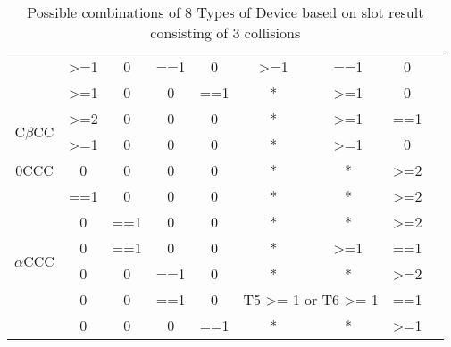 \documentclass[fleqn]{article}
\begin{document}
\begin {table} [h]
\begin{tabular}{|c|c|c|c|c|c|c|c|c|}
                             & \textgreater{}=1               & 0                              & ==1              & 0   & \textgreater{}=1                 & ==1                             & 0                \\ \cline{2-8} 
                             & \textgreater{}=1               & 0                              & 0                & ==1 & *                                & \textgreater{}=1                & 0                \\ \hline
\multirow{2}{*}{C$\beta$CC}  & \textgreater{}=2               & 0                              & 0                & 0   & *                                & \textgreater{}=1                & ==1              \\ \cline{2-8} 
                             & \textgreater{}=1               & 0                              & 0                & 0   & *                                & \textgreater{}=1                & 0                \\ \hline
0CCC                         & 0                              & 0                              & 0                & 0   & *                                & *                               & \textgreater{}=2 \\ \hline
\multirow{6}{*}{$\alpha$CCC} & ==1                            & 0                              & 0                & 0   & *                                & *                               & \textgreater{}=2 \\ \cline{2-8} 
                             & 0                              & ==1                            & 0                & 0   & *                                & *                               & \textgreater{}=2 \\ \cline{2-8} 
                             & 0                              & ==1                            & 0                & 0   & *                                & \textgreater{}=1                & ==1              \\ \cline{2-8} 
                             & 0                              & 0                              & ==1              & 0   & *                                & *                               & \textgreater{}=2 \\ \cline{2-8} 
                             & 0                              & 0                              & ==1              & 0   & \multicolumn{2}{c|}{T5 \textgreater{}= 1 or T6  \textgreater{}= 1} & ==1              \\ \cline{2-8} 
                             & 0                              & 0                              & 0                & ==1 & *                                & *                               & \textgreater{}=1 \\ \hline

\end{tabular}

\caption{Possible combinations of 8 Types of Device based on slot result consisting of 3 collisions}
\label{Tab8_3C}
\end{table}
\end{document}

